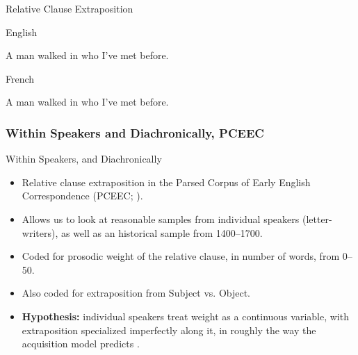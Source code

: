 \documentclass[hyperref={pdfpagelabels=false}]{beamer}
\begin{document}
\begin{frame}{Relative Clause Extraposition}
	\begin{block}{English}
		\begin{exe}
			\ex A man walked in who I've met before.
		\end{exe}
	\end{block}
	
	\begin{block}{French}
		\begin{exe}
			\ex A man walked in who I've met before.
		\end{exe}
	\end{block}

\end{frame}


\subsubsection{Within Speakers and Diachronically, PCEEC}

\begin{frame}{Within Speakers, and Diachronically}
\begin{itemize}
	\item Relative clause extraposition in the Parsed Corpus of Early English Correspondence  (PCEEC; \citealt{pceec}).
	\item Allows us to look at reasonable samples from individual speakers (letter-writers), as well as an historical sample from 1400--1700.
	\item Coded for prosodic weight of the relative clause, in number of words, from 0--50.
	\item Also coded for extraposition from Subject vs. Object.
	\item \textbf{Hypothesis:} individual speakers treat weight as a continuous variable, with extraposition specialized imperfectly along it, in roughly the way the acquisition model predicts \citep[following on][]{antonmackenzie2011a}.
\end{itemize}
\end{frame}



\end{document}
